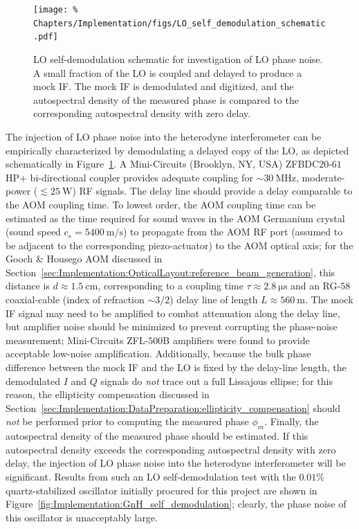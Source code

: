 \begin{figure}
  \centering
  \texttt{[image: \%
    Chapters/Implementation/figs/LO\_self\_demodulation\_schematic.pdf]}
  \caption[LO self-demodulation schematic for investigation of LO phase noise]{%
    LO self-demodulation schematic for investigation of LO phase noise.
    A small fraction of the LO is coupled and delayed to produce a mock IF.
    The mock IF is demodulated and digitized, and
    the autospectral density of the measured phase is compared
    to the corresponding autospectral density with zero delay.
  }
\label{fig:Implementation:LO_self_demodulation_schematic}
\end{figure}

The injection of LO phase noise into the heterodyne interferometer
can be empirically characterized by demodulating
a delayed copy of the LO,
as depicted schematically in
Figure~\ref{fig:Implementation:LO_self_demodulation_schematic}.
A Mini-Circuits (Brooklyn, NY, USA)
{ZFBDC$20$-$61$HP+} bi-directional coupler
provides adequate coupling for $\sim \SI{30}{\mega\hertz}$,
moderate-power ($\lesssim \SI{25}{\watt}$) RF signals.
The delay line should provide a delay comparable to the AOM coupling time.
To lowest order, the AOM coupling time can be estimated
as the time required for sound waves in the AOM Germanium crystal
(sound speed $c_s = \SI{5400}{\meter\per\second}$)
to propagate from the AOM RF port
(assumed to be adjacent to the corresponding piezo-actuator)
to the AOM optical axis;
for the Gooch \& Housego AOM discussed in
Section~\ref{sec:Implementation:OpticalLayout:reference_beam_generation},
this distance is $d \approx \SI{1.5}{\centi\meter}$,
corresponding to a coupling time $\tau \approx \SI{2.8}{\micro\second}$ and
an RG-$58$ coaxial-cable (index of refraction $\sim 3 / 2$)
delay line of length $L \approx \SI{560}{\meter}$.
The mock IF signal may need to be amplified
to combat attenuation along the delay line, but
amplifier noise should be minimized
to prevent corrupting the phase-noise measurement;
Mini-Circuits {ZFL-$500$B} amplifiers
were found to provide acceptable low-noise amplification.
Additionally, because the bulk phase difference
between the mock IF and the LO
is fixed by the delay-line length,
the demodulated $I$ and $Q$ signals
do \emph{not} trace out a full Lissajous ellipse;
for this reason, the ellipticity compensation discussed in
Section~\ref{sec:Implementation:DataPreparation:ellipticity_compensation}
should \emph{not} be performed prior to computing the measured phase $\phi_m$.
Finally, the autospectral density of the measured phase
should be estimated.
If this autospectral density exceeds
the corresponding autospectral density with zero delay,
the injection of LO phase noise into the heterodyne interferometer
will be significant.
Results from such an LO self-demodulation test with
the $0.01\%$ quartz-stabilized oscillator
initially procured for this project are shown in
Figure~\ref{fig:Implementation:GnH_self_demodulation};
clearly, the phase noise of this oscillator
is unacceptably large.

